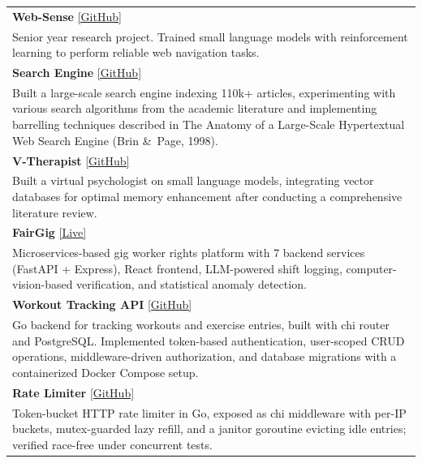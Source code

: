 \documentclass[a4paper,9pt]{extarticle}
\begin{document}
\begin{tabularx}{\linewidth}{ @{}X@{} }
\textbf{Web-Sense} \hfill \href{https://github.com/saad1551/final-year-project}{[GitHub]} \\
Senior year research project. Trained small language models with reinforcement learning to perform reliable web navigation tasks. \\[0pt]

\textbf{Search Engine} \hfill \href{https://github.com/saad1551/SearchEngine}{[GitHub]} \\
Built a large-scale search engine indexing 110k+ articles, experimenting with various search algorithms from the academic literature and implementing barrelling techniques described in The Anatomy of a Large-Scale Hypertextual Web Search Engine (Brin \&\ Page, 1998). \\[0pt]

\textbf{V-Therapist} \hfill \href{https://github.com/saad1551/psychologist-language-model}{[GitHub]} \\
Built a virtual psychologist on small language models, integrating vector databases for optimal memory enhancement after conducting a comprehensive literature review. \\[0pt]

\textbf{FairGig} \hfill \href{https://fairgig.online}{[Live]} \\
Microservices-based gig worker rights platform with 7 backend services (FastAPI + Express), React frontend, LLM-powered shift logging, computer-vision-based verification, and statistical anomaly detection. \\[0pt]

\textbf{Workout Tracking API} \hfill \href{https://github.com/saad1551/workouts}{[GitHub]} \\
Go backend for tracking workouts and exercise entries, built with chi router and PostgreSQL. Implemented token-based authentication, user-scoped CRUD operations, middleware-driven authorization, and database migrations with a containerized Docker Compose setup. \\[0pt]

\textbf{Rate Limiter} \hfill \href{https://github.com/saad1551/rate-limiter}{[GitHub]} \\
Token-bucket HTTP rate limiter in Go, exposed as chi middleware with per-IP buckets, mutex-guarded lazy refill, and a janitor goroutine evicting idle entries; verified race-free under concurrent tests. \\[0pt]


\end{tabularx}
\end{document}
